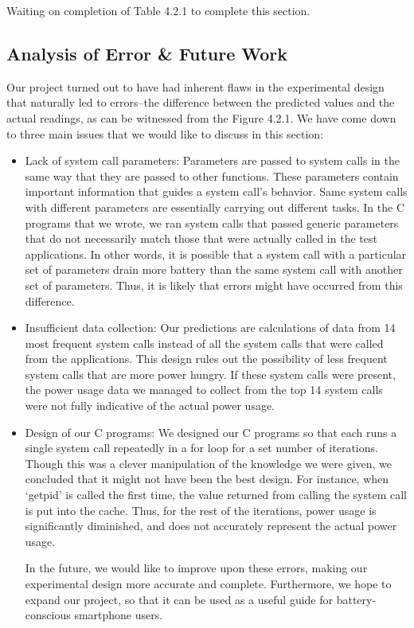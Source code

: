 \documentclass[11pt]{article}
\begin{document}
Waiting on completion of Table 4.2.1 to complete this section. 

\subsection{Analysis of Error \& Future Work}
Our project turned out to have had inherent flaws in the experimental design that naturally led to errors--the difference between the predicted 
values and the actual readings, as can be witnessed from the Figure 4.2.1. We have come down to three main issues that we would like to discuss 
in this section:

\begin{itemize}
  \item Lack of system call parameters: Parameters are passed to system calls in the same way that they are passed to other functions. 
  These parameters contain important information that guides a system call’s behavior. Same system calls with different parameters are essentially 
  carrying out different tasks. In the C programs that we wrote, we ran system calls that passed generic parameters that do not necessarily match 
  those that were actually called in the test applications. In other words, it is possible that a system call with a particular set of parameters 
  drain more battery than the same system call with another set of parameters. Thus, it is likely that errors might have occurred from this difference. 
  \item Insufficient data collection: Our predictions are calculations of data from 14 most frequent system calls instead of all the system calls 
  that were called from the applications. This design rules out the possibility of less frequent system calls that are more power hungry. If these 
  system calls were present, the power usage data we managed to collect from the top 14 system calls were not fully indicative of the actual power usage. 
  \item Design of our C programs: We designed our C programs so that each runs a single system call repeatedly in a for loop for a set number of iterations. 
  Though this was a clever manipulation of the knowledge we were given, we concluded that it might not have been the best design. For instance, when `getpid’ 
  is called the first time, the value returned from calling the system call is put into the cache. Thus, for the rest of the iterations, power usage is 
  significantly diminished, and does not accurately represent the actual power usage. 

In the future, we would like to improve upon these errors, making our experimental design more accurate and complete. Furthermore, we hope to expand our project, 
so that it can be used as a useful guide for battery-conscious smartphone users. 
\end{itemize}
\end{document}
